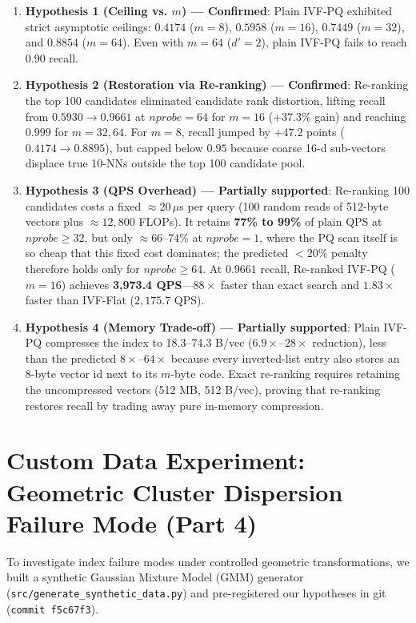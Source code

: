 \documentclass[10pt,twocolumn,a4paper]{article}
\begin{document}
\begin{enumerate}
    \item \textbf{Hypothesis 1 (Ceiling vs. $m$) --- Confirmed}: Plain IVF-PQ exhibited strict asymptotic ceilings: $0.4174$ ($m=8$), $0.5958$ ($m=16$), $0.7449$ ($m=32$), and $0.8854$ ($m=64$). Even with $m=64$ ($d'=2$), plain IVF-PQ fails to reach 0.90 recall.
    \item \textbf{Hypothesis 2 (Restoration via Re-ranking) --- Confirmed}: Re-ranking the top 100 candidates eliminated candidate rank distortion, lifting recall from $0.5930 \to \mathbf{0.9661}$ at $nprobe=64$ for $m=16$ ($+37.3\%$ gain) and reaching $0.999$ for $m=32, 64$. For $m=8$, recall jumped by $+47.2$ points ($0.4174 \to 0.8895$), but capped below $0.95$ because coarse 16-d sub-vectors displace true 10-NNs outside the top 100 candidate pool.
    \item \textbf{Hypothesis 3 (QPS Overhead) --- Partially supported}: Re-ranking 100 candidates costs a fixed $\approx 20\,\mu$s per query (100 random reads of 512-byte vectors plus $\approx 12,800$ FLOPs). It retains \textbf{77\% to 99\%} of plain QPS at $nprobe \ge 32$, but only $\approx 66$--$74\%$ at $nprobe=1$, where the PQ scan itself is so cheap that this fixed cost dominates; the predicted $<20\%$ penalty therefore holds only for $nprobe \ge 64$. At $0.9661$ recall, Re-ranked IVF-PQ ($m=16$) achieves \textbf{3,973.4 QPS}---$88\times$ faster than exact search and $1.83\times$ faster than IVF-Flat ($2,175.7$ QPS).
    \item \textbf{Hypothesis 4 (Memory Trade-off) --- Partially supported}: Plain IVF-PQ compresses the index to 18.3--74.3 B/vec ($6.9\times$--$28\times$ reduction), less than the predicted $8\times$--$64\times$ because every inverted-list entry also stores an 8-byte vector id next to its $m$-byte code. Exact re-ranking requires retaining the uncompressed vectors (512 MB, 512 B/vec), proving that re-ranking restores recall by trading away pure in-memory compression.
\end{enumerate}

\section{Custom Data Experiment: Geometric Cluster Dispersion Failure Mode (Part 4)}
To investigate index failure modes under controlled geometric transformations, we built a synthetic Gaussian Mixture Model (GMM) generator (\texttt{src/generate\_synthetic\_data.py}) and pre-registered our hypotheses in git (\texttt{commit f5c67f3}).
\end{document}
